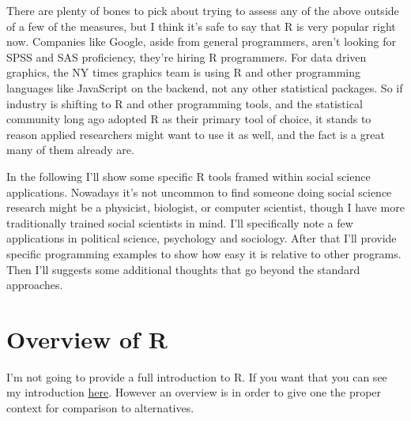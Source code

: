 \documentclass[english,nohyper,titlepage]{tufte-handout}\usepackage[]{graphicx}\usepackage[]{color}
\begin{document}
There are plenty of bones to pick about trying to assess any of the above outside of a few of the measures, but I think it's safe to say that R is very popular right now.  Companies like Google, aside from general programmers, aren't looking for SPSS and SAS proficiency, they're hiring R programmers. For data driven graphics, the NY times graphics team is using R and other programming languages like JavaScript on the backend, not any other statistical packages.   So if industry is shifting to R and other programming tools, and the statistical community long ago adopted R as their primary tool of choice, it stands to reason applied researchers might want to use it as well, and the fact is a great many of them already are.

In the following I'll show some specific R tools framed within social science applications.  Nowadays it's not uncommon to find someone doing social science research might be a physicist, biologist, or computer scientist, though I have more traditionally trained social scientists in mind.  I'll specifically note a few applications in political science, psychology and sociology.  After that I'll provide specific programming examples to show how easy it is relative to other programs.  Then I'll suggests some additional thoughts that go beyond the standard approaches.







\part{Overview of R}
I'm not going to provide a full introduction to R.  If you want that you can see my introduction \href{http://www.nd.edu/~mclark19/learn/Introduction_to_R.pdf}{here}.  However an overview is in order to give one the proper context for comparison to alternatives.
\end{document}
